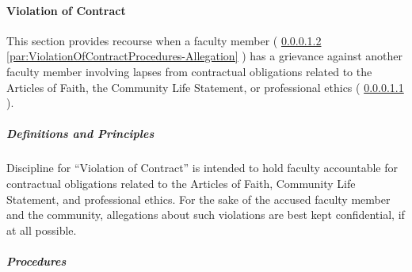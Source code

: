			\paragraph{Violation of Contract}
				\label{sec:ViolationOfContract}
				This section provides recourse when a faculty member (
				\ref{sec:ViolationOfContractProcedures}
				\ref{par:ViolationOfContractProcedures-Allegation}
				) has a grievance against another faculty member involving lapses from contractual obligations related to the Articles of Faith, the Community Life Statement, or professional ethics
				(
				\ref{sec:ViolationOfContractDefinitions}
				).
				\subparagraph{Definitions and Principles}
					\label{sec:ViolationOfContractDefinitions}
					Discipline for ``Violation of Contract'' is intended to hold faculty accountable for contractual obligations related to the Articles of Faith, Community Life Statement, and professional ethics.  For the sake of the accused faculty member and the community, allegations about such violations are best kept confidential, if at all possible.
				\subparagraph{Procedures}
					\label{sec:ViolationOfContractProcedures}
